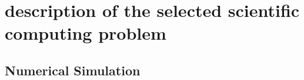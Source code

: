 \glsresetall
 \graphicspath{{figures/analysing/}}
%
		
		
\part{description of the selected scientific computing problem}\label{pt:design} 
\graphicspath{{figures/design/}}
\chapter{Numerical Simulation}\label{ch:numerical} 
  
		 


\graphicspath{{figures/tests/}}


% 
%

\glsresetall
\appendix %

 \graphicspath{{figures/appendix/}}



